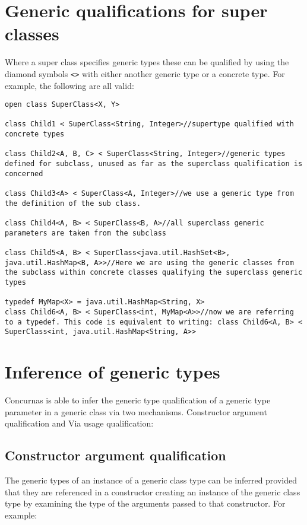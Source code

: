 \documentclass[conc-doc]{subfiles}
\begin{document}
\section{Generic qualifications for super classes}
Where a super class specifies generic types these can be qualified by using the diamond symbols \lstinline{<>} with either another generic type or a concrete type. For example, the following are all valid:

\begin{lstlisting}
open class SuperClass<X, Y>

class Child1 < SuperClass<String, Integer>//supertype qualified with concrete types

class Child2<A, B, C> < SuperClass<String, Integer>//generic types defined for subclass, unused as far as the superclass qualification is concerned

class Child3<A> < SuperClass<A, Integer>//we use a generic type from the definition of the sub class.

class Child4<A, B> < SuperClass<B, A>//all superclass generic parameters are taken from the subclass

class Child5<A, B> < SuperClass<java.util.HashSet<B>, java.util.HashMap<B, A>>//Here we are using the generic classes from the subclass within concrete classes qualifying the superclass generic types

typedef MyMap<X> = java.util.HashMap<String, X>
class Child6<A, B> < SuperClass<int, MyMap<A>>//now we are referring to a typedef. This code is equivalent to writing: class Child6<A, B> < SuperClass<int, java.util.HashMap<String, A>>
\end{lstlisting}

\section{Inference of generic types}
Concurnas is able to infer the generic type qualification of a generic type parameter in a generic class via two mechanisms. Constructor argument qualification and Via usage qualification:

\subsection{Constructor argument qualification}
The generic types of an instance of a generic class type can be inferred provided that they are referenced in a constructor creating an instance of the generic class type by examining the type of the arguments passed to that constructor. For example:
\end{document}

